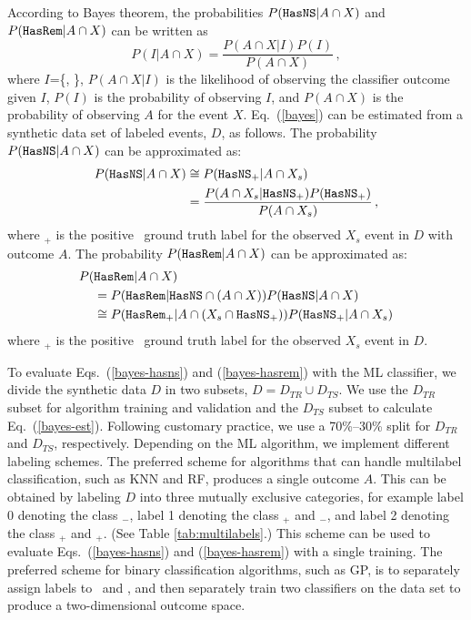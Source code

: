 According to Bayes theorem, the probabilities $P({{\tt HasNS}}|A \cap X)$ and $P({{\tt HasRem}}|A \cap X)$ can be written as
%
\begin{equation}
P(I|A \cap X)=\frac{P(A \cap X|I)P(I)}{P(A \cap X)}\,,
\label{bayes}
\end{equation}
%
where $I$=\{\hasns, \hasrem\}, $P(A \cap X|I)$ is the likelihood of observing the classifier outcome given $I$, $P(I)$ is the probability of observing $I$, and $P(A \cap X)$
is the probability of observing $A$ for the event $X$. Eq.~(\ref{bayes}) can be estimated from a synthetic data set of labeled events, $D$, as follows. The probability $P({{\tt HasNS}}|A \cap X)$ can be approximated as:  
%
\begin{align}
P({{\tt HasNS}}|A \cap X)&\cong P({{\tt HasNS}}_+|A \cap X_s)\nonumber\\
&=\frac{P(A \cap X_s|{{\tt HasNS}}_+)P({{\tt HasNS}}_+)}{P(A \cap X_s)}\,,
\label{bayes-hasns}
\end{align}
%
where \hasns$_+$ is the positive \hasns\ ground truth label for the observed $X_s$ event in $D$ with outcome $A$. The probability $P({{\tt HasRem}}|A \cap X)$ can be approximated as:
%
\begin{align}
P(&{{\tt HasRem}}|A \cap X)\nonumber\\
&=P({{\tt HasRem}}|{{\tt HasNS}} \cap (A \cap X))P({{\tt HasNS}}|A \cap X)\nonumber\\
&\cong P({{\tt HasRem}}_+|A \cap (X_s \cap {{\tt HasNS}}_+))P({{\tt HasNS}}_+|A \cap X_s)
\label{bayes-hasrem}
\end{align}
%
where \hasrem$_+$ is the positive \hasrem\ ground truth label for the observed $X_s$ event in $D$.

To evaluate Eqs.~(\ref{bayes-hasns}) and (\ref{bayes-hasrem}) with the \ac{ML} classifier, we divide the synthetic data $D$ in two subsets, $D=D_{TR}\cup D_{TS}$. We use the $D_{TR}$ subset for
algorithm training and validation and the $D_{TS}$ subset to calculate Eq.~(\ref{bayes-est}). Following customary practice, we use a 70\%--30\% split for $D_{TR}$ and $D_{TS}$, respectively.
Depending on the \ac{ML} algorithm, we implement different labeling schemes. The preferred scheme for algorithms that can handle multilabel classification, such as \ac{KNN} and \ac{RF}, produces a
single outcome $A$. This can be obtained by labeling $D$ into three mutually exclusive categories, for example label 0 denoting the class \hasns$_-$, label 1 denoting the class \hasns$_+$ and
\hasrem$_-$, and label 2 denoting the class \hasns$_+$ and \hasrem$_+$. (See Table \ref{tab:multilabels}.) This scheme can be used to evaluate Eqs.~(\ref{bayes-hasns}) and (\ref{bayes-hasrem})
with a single training. The preferred scheme for binary classification algorithms, such as \ac{GP}, is to separately assign labels to \hasns\ and \hasrem, and then separately train two classifiers
on the data set to produce a two-dimensional outcome space.  


